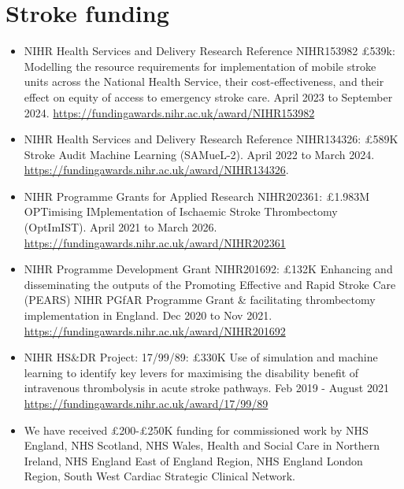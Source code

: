

\section{Stroke funding}

\begin{itemize}
    \item NIHR Health Services and Delivery Research Reference NIHR153982 £539k: Modelling the resource requirements for implementation of mobile stroke units across the National Health Service, their cost-effectiveness, and their effect on equity of access to emergency stroke care. April 2023 to September 2024. \url{https://fundingawards.nihr.ac.uk/award/NIHR153982}

    \item NIHR Health Services and Delivery Research Reference NIHR134326: £589K Stroke Audit Machine Learning (SAMueL-2). April 2022 to March 2024. \url{https://fundingawards.nihr.ac.uk/award/NIHR134326}.

    \item NIHR Programme Grants for Applied Research NIHR202361: £1.983M OPTimising IMplementation of Ischaemic Stroke Thrombectomy (OptImIST). April 2021 to March 2026. \url{https://fundingawards.nihr.ac.uk/award/NIHR202361}

    \item NIHR Programme Development Grant NIHR201692: £132K Enhancing and disseminating the outputs of the Promoting Effective and Rapid Stroke Care (PEARS) NIHR PGfAR Programme Grant \& facilitating thrombectomy implementation in England. Dec 2020 to Nov 2021. \url{https://fundingawards.nihr.ac.uk/award/NIHR201692}

    \item NIHR HS\&DR Project: 17/99/89: £330K Use of simulation and machine learning to identify key levers for maximising the disability benefit of intravenous thrombolysis in acute stroke pathways. Feb 2019 - August 2021 \url{https://fundingawards.nihr.ac.uk/award/17/99/89}

    \item We have received £200-£250K funding for commissioned work by NHS England, NHS Scotland, NHS Wales, Health and Social Care in Northern Ireland, NHS England East of England Region, NHS England London Region, South West Cardiac Strategic Clinical Network.
    
\end{itemize}

